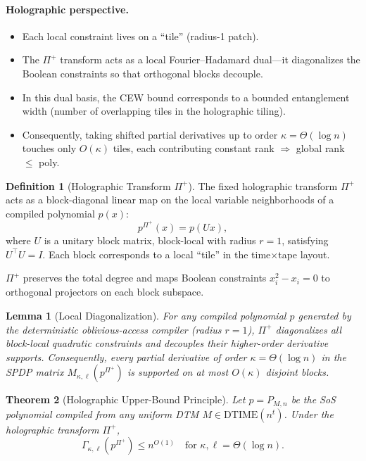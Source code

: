 \documentclass[12pt]{article}
\newtheorem{theorem}{Theorem}
\newtheorem{lemma}[theorem]{Lemma}
\theoremstyle{definition}
\newtheorem{definition}{Definition}
\theoremstyle{definition}
\theoremstyle{remark}
\theoremstyle{remark}
\begin{document}
\paragraph{Holographic perspective.}
\begin{itemize}
\item Each local constraint lives on a ``tile'' (radius-1 patch).
\item The $\Pi^+$ transform acts as a local Fourier--Hadamard dual---it diagonalizes the Boolean constraints so that orthogonal blocks decouple.
\item In this dual basis, the CEW bound corresponds to a bounded entanglement width (number of overlapping tiles in the holographic tiling).
\item Consequently, taking shifted partial derivatives up to order $\kappa = \Theta(\log n)$ touches only $O(\kappa)$ tiles, each contributing constant rank $\Rightarrow$ global rank $\leq$ poly.
\end{itemize}

\begin{definition}[Holographic Transform $\Pi^+$]\label{def:holographic-transform}
The fixed holographic transform $\Pi^+$ acts as a block-diagonal linear map on the local variable neighborhoods of a compiled polynomial $p(x)$:
\[
p^{\Pi^+}(x) = p(Ux),
\]
where $U$ is a unitary block matrix, block-local with radius $r=1$, satisfying $U^\top U = I$. Each block corresponds to a local ``tile'' in the time$\times$tape layout.

$\Pi^+$ preserves the total degree and maps Boolean constraints $x_i^2 - x_i = 0$ to orthogonal projectors on each block subspace.
\end{definition}

\begin{lemma}[Local Diagonalization]\label{lem:local-diagonalization}
For any compiled polynomial $p$ generated by the deterministic oblivious-access compiler (radius $r=1$), $\Pi^+$ diagonalizes all block-local quadratic constraints and decouples their higher-order derivative supports. Consequently, every partial derivative of order $\kappa = \Theta(\log n)$ in the SPDP matrix $M_{\kappa,\ell}(p^{\Pi^+})$ is supported on at most $O(\kappa)$ disjoint blocks.
\end{lemma}

\begin{theorem}[Holographic Upper-Bound Principle]\label{thm:holo-upper-bound}
Let $p = P_{M,n}$ be the SoS polynomial compiled from any uniform DTM $M \in \mathrm{DTIME}(n^t)$. Under the holographic transform $\Pi^+$,
\[
\Gamma_{\kappa,\ell}(p^{\Pi^+}) \leq n^{O(1)} \quad\text{for } \kappa, \ell = \Theta(\log n).
\]
\end{theorem}
\end{document}
